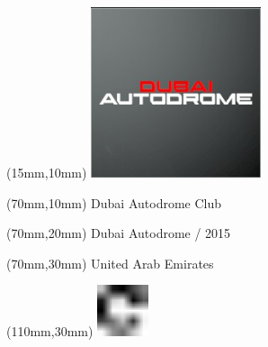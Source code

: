 \null\newpage
\begin{textblock*}{50mm}(15mm,10mm)%
\includegraphics[width=50mm]{LG/2015-05-20_00081.png}
\end{textblock*}
\begin{textblock*}{130mm}(70mm,10mm)%
{\fontsize{20}{20}\selectfont Dubai Autodrome Club}\\
\end{textblock*}
\begin{textblock*}{120mm}(70mm,20mm)%
{\fontsize{16}{16}\selectfont Dubai Autodrome / 2015}\\
\end{textblock*}
\begin{textblock*}{120mm}(70mm,30mm)%
{\fontsize{12}{12}\selectfont United Arab Emirates}
\end{textblock*}
\begin{textblock*}{30mm}(110mm,30mm)%
\centering
\includegraphics[height=15mm]{icons/fa-rotate-right.pdf}
\end{textblock*}
